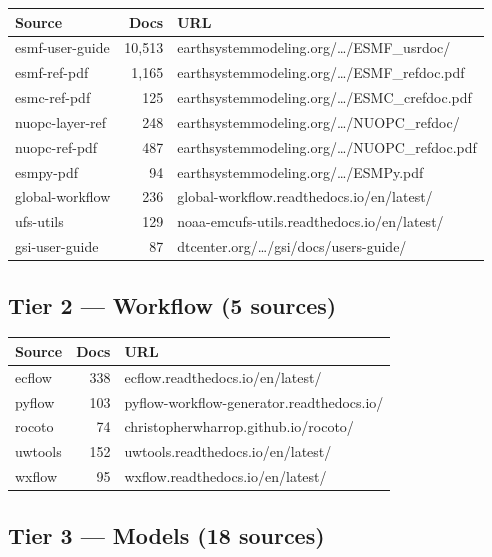 \documentclass[11pt,letterpaper]{article}
\begin{document}
\begin{longtable}{p{3.2cm}rp{7.5cm}}
\toprule
\textbf{Source} & \textbf{Docs} & \textbf{URL} \\
\midrule
\endhead
esmf-user-guide & 10,513 & earthsystemmodeling.org/\ldots/ESMF\_usrdoc/ \\
esmf-ref-pdf & 1,165 & earthsystemmodeling.org/\ldots/ESMF\_refdoc.pdf \\
esmc-ref-pdf & 125 & earthsystemmodeling.org/\ldots/ESMC\_crefdoc.pdf \\
nuopc-layer-ref & 248 & earthsystemmodeling.org/\ldots/NUOPC\_refdoc/ \\
nuopc-ref-pdf & 487 & earthsystemmodeling.org/\ldots/NUOPC\_refdoc.pdf \\
esmpy-pdf & 94 & earthsystemmodeling.org/\ldots/ESMPy.pdf \\
global-workflow & 236 & global-workflow.readthedocs.io/en/latest/ \\
ufs-utils & 129 & noaa-emcufs-utils.readthedocs.io/en/latest/ \\
gsi-user-guide & 87 & dtcenter.org/\ldots/gsi/docs/users-guide/ \\
\bottomrule
\end{longtable}

\subsection{Tier 2 — Workflow (5 sources)}

\begin{longtable}{p{3.2cm}rp{7.5cm}}
\toprule
\textbf{Source} & \textbf{Docs} & \textbf{URL} \\
\midrule
\endhead
ecflow & 338 & ecflow.readthedocs.io/en/latest/ \\
pyflow & 103 & pyflow-workflow-generator.readthedocs.io/ \\
rocoto & 74 & christopherwharrop.github.io/rocoto/ \\
uwtools & 152 & uwtools.readthedocs.io/en/latest/ \\
wxflow & 95 & wxflow.readthedocs.io/en/latest/ \\
\bottomrule
\end{longtable}

\subsection{Tier 3 — Models (18 sources)}
\end{document}
